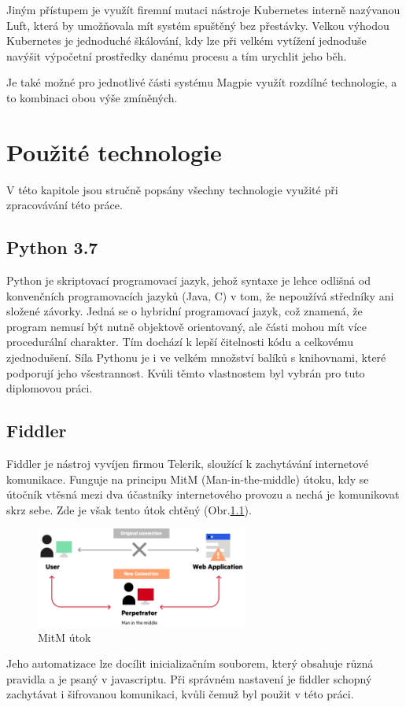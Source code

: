 \documentclass[thesis=M,czech,hidelinks]{FITthesis}[2013/05/06]
\begin{document}
Jiným přístupem je využít firemní mutaci nástroje Kubernetes interně nazývanou Luft, která by umožňovala mít systém spuštěný bez přestávky. Velkou výhodou Kubernetes je jednoduché škálování, kdy lze při velkém vytížení jednoduše navýšit výpočetní prostředky danému procesu a tím urychlit jeho běh.

Je také možné pro jednotlivé části systému Magpie využít rozdílné technologie, a to kombinaci obou výše zmíněných.






\chapter{Použité technologie}
V této kapitole jsou stručně popsány všechny technologie využité při zpracovávání této práce.
\section{Python 3.7}\label{sec:python}
Python je skriptovací programovací jazyk, jehož syntaxe je lehce odlišná od konvenčních programovacích jazyků (Java, C) v tom, že nepoužívá středníky ani složené závorky. Jedná se o hybridní programovací jazyk, což znamená, že program nemusí být nutně objektově orientovaný, ale části mohou mít více procedurální charakter. Tím dochází k lepší čitelnosti kódu a celkovému zjednodušení. Síla Pythonu je i ve velkém množství balíků s knihovnami, které podporují jeho všestrannost. Kvůli těmto vlastnostem byl vybrán pro tuto diplomovou práci.

\section{Fiddler}\label{sec:fiddler}
Fiddler\cite{fiddler} je nástroj vyvíjen firmou Telerik, sloužící k zachytávání internetové komunikace. Funguje na principu MitM (Man-in-the-middle) útoku, kdy se útočník vtěsná mezi dva účastníky internetového provozu a nechá je komunikovat skrz sebe. Zde je však tento útok chtěný (Obr.\ref{fig:mitm}).
\begin{figure}[h]
	\centering
	\includegraphics[width=7cm]{pictures/mitm.png}
	\caption{MitM útok \cite{mitm}}
	\label{fig:mitm}
\end{figure}
Jeho automatizace lze docílit inicializačním souborem, který obsahuje různá pravidla a je psaný v javascriptu. Při správném nastavení je fiddler schopný zachytávat i šifrovanou komunikaci, kvůli čemuž byl použit v této práci.
\end{document}
